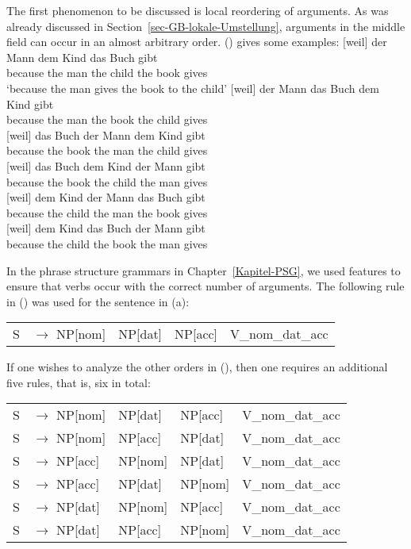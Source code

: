 The first phenomenon to be discussed is local reordering of arguments. As was already discussed in
Section~\ref{sec-GB-lokale-Umstellung}, arguments in the middle field can occur in an almost
arbitrary order. () gives some examples:
\eal
\label{bsp-GPSG-anordnung}
\ex 
\gll {}[weil] der Mann dem Kind das Buch gibt\\
     \spacebr{}because the man the child the book gives\\
\glt `because the man gives the book to the child'
\ex 
\gll {}[weil] der Mann das Buch dem Kind gibt\\
     \spacebr{}because the man the book the child gives\\
\ex
\gll {}[weil] das Buch der Mann dem Kind gibt\\
     \spacebr{}because the book the man the child gives\\
\ex 
\gll {}[weil] das Buch dem Kind der Mann gibt\\
     \spacebr{}because the book the child the man gives\\
\ex 
\gll {}[weil] dem Kind der Mann das Buch gibt\\
     \spacebr{}because the child the man the book gives\\
\ex 
\gll {}[weil] dem Kind das Buch der Mann gibt\\
     \spacebr{}because the child the book the man gives\\
\zl

\noindent
In the phrase structure grammars in Chapter~\ref{Kapitel-PSG}, we used features to ensure that verbs occur with the correct number of arguments. The following rule in () was
used for the sentence in (a):
\ea
\begin{tabular}[t]{@{}l@{ }l@{ }l@{ }l@{ }l@{ }}
S  & $\to$ NP[nom]& NP[dat] & NP[acc] & V\_nom\_dat\_acc\\
\end{tabular}
\z
If one wishes to analyze the other orders in (), then one requires an additional five rules, that is, six in total:
\ea
\label{Regeln-PSG-Abfolge}
\begin{tabular}[t]{@{}l@{ }l@{ }l@{ }l@{ }l@{ }}
S  & $\to$ NP[nom]& NP[dat] & NP[acc] & V\_nom\_dat\_acc\\
S  & $\to$ NP[nom]& NP[acc] & NP[dat] & V\_nom\_dat\_acc\\
S  & $\to$ NP[acc]& NP[nom] & NP[dat] & V\_nom\_dat\_acc\\
S  & $\to$ NP[acc]& NP[dat] & NP[nom] & V\_nom\_dat\_acc\\
S  & $\to$ NP[dat]& NP[nom] & NP[acc] & V\_nom\_dat\_acc\\
S  & $\to$ NP[dat]& NP[acc] & NP[nom] & V\_nom\_dat\_acc\\
\end{tabular}
\z

